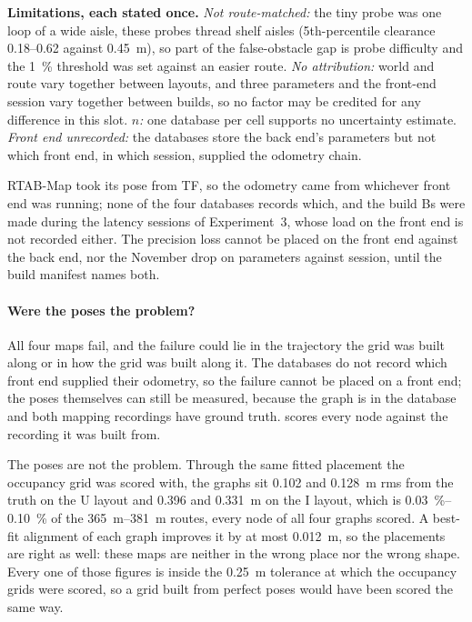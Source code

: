 \documentclass[11pt,a4paper,notitlepage]{report}
\begin{document}
\textbf{Limitations, each stated once.} \emph{Not route-matched:} the tiny
probe was one loop of a wide aisle, these probes thread shelf aisles
(5th-percentile clearance 0.18--0.62 against \SI{0.45}{\metre}), so part of the
false-obstacle gap is probe difficulty and the \SI{1}{\percent} threshold was
set against an easier route. \emph{No attribution:} world and route vary
together between layouts, and three parameters and the front-end session vary
together between builds, so no factor may be credited for any difference in
this slot. \emph{$n$:} one database per cell supports no uncertainty estimate.
\emph{Front end unrecorded:} the databases store the back end's parameters but
not which front end, in which session, supplied the odometry chain.

\begin{queried}
RTAB-Map took its pose from TF, so the odometry came from whichever front end
was running; none of the four databases records which, and the build Bs
were made during the latency sessions of Experiment~3, whose load on the front
end is not recorded either. The precision loss cannot be placed on the front
end against the back end, nor the November drop on parameters against session,
until the build manifest names both.
\end{queried}

\paragraph{Were the poses the problem?} All four maps fail, and the failure
could lie in the trajectory the grid was built along or in how the grid was
built along it. The databases do not record which front end supplied their
odometry, so the failure cannot be placed on a front end; the poses
themselves can still be measured,
because the graph is in the database and both mapping recordings have ground
truth.  scores every node against the recording
it was built from.

The poses are not the problem. Through the same fitted placement the occupancy
grid was scored with, the graphs sit \SI{0.102}{} and
\SI{0.128}{\metre} rms from the truth on the U layout and \SI{0.396}{} and
\SI{0.331}{\metre} on the I layout, which is \SIrange{0.03}{0.10}{\percent}
of the \SIrange{365}{381}{\metre} routes, every node of all four graphs
scored. A best-fit alignment of each graph
improves it by at most \SI{0.012}{\metre}, so the placements are right as
well: these maps are neither in the wrong place nor the wrong shape. Every one
of those figures is inside the \SI{0.25}{\metre} tolerance at which the
occupancy grids were scored, so a grid built from perfect poses would have been
scored the same way.
\end{document}
